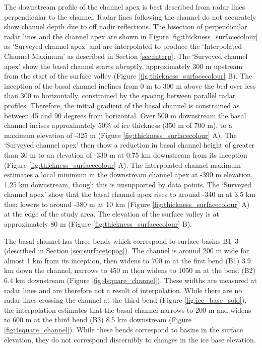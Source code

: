 The downstream profile of the channel apex is best described from radar lines perpendicular to the channel. Radar lines following the channel do not accurately show channel depth due to off nadir reflections.  The bisection of perpendicular radar lines and the channel apex are shown in Figure \ref{fig:thickness_surfacecolour} as `Surveyed channel apex' and are interpolated to produce the `Interpolated Channel Maximum' as described in Section \ref{sec:interp}.  The `Surveyed channel apex' show the basal channel starts abruptly, approximately 300 m upstream from the start of the surface valley (Figure \ref{fig:thickness_surfacecolour} B). The inception of the basal channel inclines from 0 m to 300 m above the bed over less than 300 m horizontally, constrained by the spacing between parallel radar profiles. Therefore, the initial gradient of the basal channel is constrained as between 45 and 90 degrees from horizontal. Over 500 m downstream the basal channel incises approximately 50\% of ice thickness (350 m of 700 m), to a maximum elevation of -325 m (Figure \ref{fig:thickness_surfacecolour} A).
The `Surveyed channel apex' then show a reduction in basal channel height of greater than 30 m to an elevation of -330 m at 0.75 km downstream from its inception (Figure \ref{fig:thickness_surfacecolour} A). The interpolated channel maximum estimates a local minimum in the downstream channel apex at -390 m elevation, 1.25 km downstream, though this is unsupported by data points.  The `Surveyed channel apex' show that the basal channel apex rises to around -340 m at 3.5 km then lowers to around -380 m at 10 km (Figure \ref{fig:thickness_surfacecolour} A) at the edge of the study area. The elevation of the surface valley is at approximately 80 m (Figure \ref{fig:thickness_surfacecolour} B). 

The basal channel has three bends which correspond to surface basins B1--3 (described in Section \ref{sec:surfacetopog}). The channel is around 200 m wide for almost 1 km from its inception, then widens to 700 m at the first bend (B1) 3.9 km down the channel, narrows to 450 m then widens to 1050 m at the bend (B2) 6.4 km downstream (Figure \ref{fig:4square_channel}). These widths are measured at radar lines and are therefore not a result of interpolation. While there are no radar lines crossing the channel at the third bend (Figure \ref{fig:ice_base_solo}), the interpolation estimates that the basal channel narrows to 200 m and widens to 600 m at the third bend (B3) 8.5 km downstream (Figure \ref{fig:4square_channel}). While these bends correspond to basins in the surface elevation, they do not correspond discernibly to changes in the ice base elevation. 


